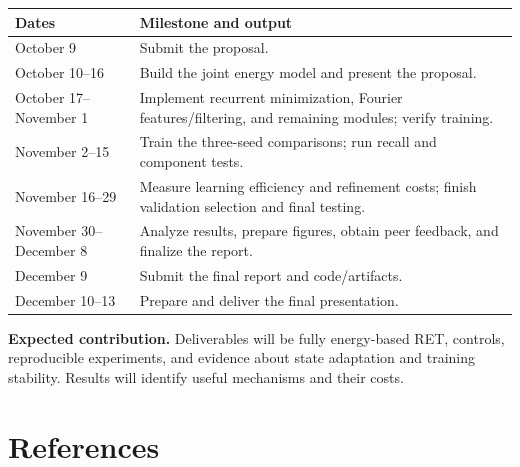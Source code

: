 \documentclass[11pt,letterpaper]{article}
\begin{document}
\smallskip\begin{tabularx}{\textwidth}{@{}p{3.2cm}X@{}}\toprule
\textbf{Dates} & \textbf{Milestone and output}\\\midrule
October 9 & Submit the proposal.\\
October 10–16 & Build the joint energy model and present the proposal.\\
October 17–November 1 & Implement recurrent minimization, Fourier features/filtering, and remaining modules; verify training.\\
November 2–15 & Train the three-seed comparisons; run recall and component tests.\\
November 16–29 & Measure learning efficiency and refinement costs; finish validation selection and final testing.\\
November 30–December 8 & Analyze results, prepare figures, obtain peer feedback, and finalize the report.\\
December 9 & Submit the final report and code/artifacts.\\
December 10–13 & Prepare and deliver the final presentation.\\
\bottomrule\end{tabularx}\smallskip

\textbf{Expected contribution.} Deliverables will be fully energy-based RET, controls, reproducible experiments, and evidence about state adaptation and training stability. Results will identify useful mechanisms and their costs.

\newpage
\section*{References}
\end{document}
